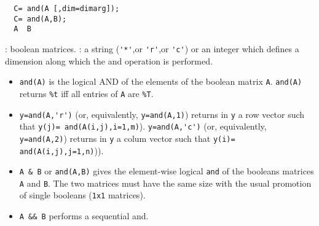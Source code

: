\begin{mandesc}
\end{mandesc}
\begin{calling_sequence}
\begin{verbatim}
  C= and(A [,dim=dimarg]);
  C= and(A,B);
  A  B 
\end{verbatim}
\end{calling_sequence}
\begin{parameters}
  \begin{varlist}
    : boolean matrices. 
    : a string (\verb!'*'!,or \verb!'r'!,or \verb!'c'!) or an integer which defines 
    a dimension along which the and operation is performed. 
  \end{varlist}
\end{parameters}

\begin{mandescription}
  \begin{itemize} 
  \item \verb!and(A)! is the logical AND of the elements of the boolean matrix \verb!A!. 
    \verb!and(A)! returns \verb!%t! iff all entries of \verb!A! are \verb!%T!. 
  \item \verb!y=and(A,'r')! (or, equivalently, \verb!y=and(A,1)!) returns in \verb!y! a row vector 
    such that \verb!y(j)= and(A(i,j),i=1,m)!). 
    \verb!y=and(A,'c')! (or, equivalently, \verb!y=and(A,2)!) returns in \verb!y! a colum vector 
    such that \verb!y(i)= and(A(i,j),j=1,n)!)).
  \item \verb!A & B! or \verb!and(A,B)! gives the element-wise logical \verb!and!
    of the booleans matrices \verb!A! and  \verb!B!. The two matrices must have the same size 
    with the usual promotion of single booleans (\verb!1x1! matrices). 
  \item \verb!A && B! performs a sequential and. 
  \end{itemize} 
\end{mandescription}
\begin{manseealso}
     
\end{manseealso}

